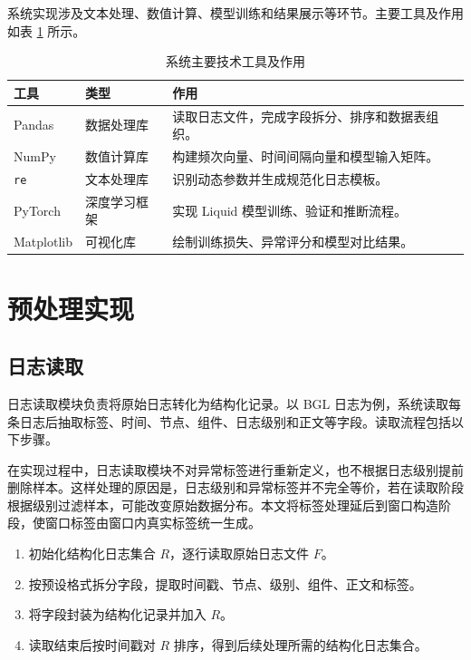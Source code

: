 系统实现涉及文本处理、数值计算、模型训练和结果展示等环节。主要工具及作用如表 \ref{tab:main_technical_tools_revised} 所示。

\begin{table}[htbp]
    \centering
    \caption{系统主要技术工具及作用}
    \label{tab:main_technical_tools_revised}
    \begin{tabular}{p{3cm}p{3cm}p{6cm}}
        \hline
        \textbf{工具} & \textbf{类型} & \textbf{作用} \\
        \hline
        Pandas & 数据处理库 & 读取日志文件，完成字段拆分、排序和数据表组织。 \\
        NumPy & 数值计算库 & 构建频次向量、时间间隔向量和模型输入矩阵。 \\
        \texttt{re} & 文本处理库 & 识别动态参数并生成规范化日志模板。 \\
        PyTorch & 深度学习框架 & 实现 Liquid 模型训练、验证和推断流程。 \\
        Matplotlib & 可视化库 & 绘制训练损失、异常评分和模型对比结果。 \\
        \hline
    \end{tabular}
\end{table}

\section{预处理实现}

\subsection{日志读取}

日志读取模块负责将原始日志转化为结构化记录。以 BGL 日志为例，系统读取每条日志后抽取标签、时间、节点、组件、日志级别和正文等字段。读取流程包括以下步骤。

在实现过程中，日志读取模块不对异常标签进行重新定义，也不根据日志级别提前删除样本。这样处理的原因是，日志级别和异常标签并不完全等价，若在读取阶段根据级别过滤样本，可能改变原始数据分布。本文将标签处理延后到窗口构造阶段，使窗口标签由窗口内真实标签统一生成。

\begin{enumerate}
    \item 初始化结构化日志集合 $R$，逐行读取原始日志文件 $F$。
    \item 按预设格式拆分字段，提取时间戳、节点、级别、组件、正文和标签。
    \item 将字段封装为结构化记录并加入 $R$。
    \item 读取结束后按时间戳对 $R$ 排序，得到后续处理所需的结构化日志集合。
\end{enumerate}

